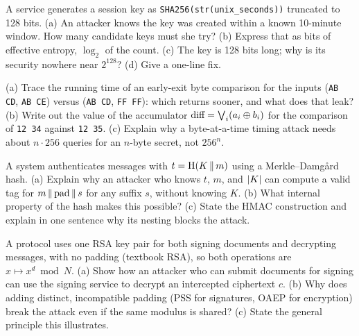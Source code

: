 \begin{exercise}
\label{ch38:ex-entropy}
A service generates a session key as \texttt{SHA256(\allowbreak str(\allowbreak unix\_seconds))} truncated to 128 bits. (a) An attacker knows the key was created within a known 10-minute window. How many candidate keys must she try? (b) Express that as bits of effective entropy, $\log_2$ of the count. (c) The key is 128 bits long; why is its security nowhere near $2^{128}$? (d) Give a one-line fix.
\end{exercise}

\begin{exercise}
\label{ch38:ex-ct}
(a) Trace the running time of an early-exit byte comparison for the inputs (\texttt{AB CD}, \texttt{AB CE}) versus (\texttt{AB CD}, \texttt{FF FF}): which returns sooner, and what does that leak? (b) Write out the value of the accumulator $\text{diff} = \bigvee_i (a_i \oplus b_i)$ for the comparison of \texttt{12 34} against \texttt{12 35}. (c) Explain why a byte-at-a-time timing attack needs about $n \cdot 256$ queries for an $n$-byte secret, not $256^n$.
\end{exercise}

\begin{exercise}
\label{ch38:ex-lenext}
A system authenticates messages with $t = \operatorname{H}(K \,\|\, m)$ using a Merkle--Damg{\aa}rd hash. (a) Explain why an attacker who knows $t$, $m$, and $\lvert K\rvert$ can compute a valid tag for $m \,\|\, \text{pad} \,\|\, s$ for any suffix $s$, without knowing $K$. (b) What internal property of the hash makes this possible? (c) State the HMAC construction and explain in one sentence why its nesting blocks the attack.
\end{exercise}

\begin{exercise}
\label{ch38:ex-keyreuse}
A protocol uses one RSA key pair for both signing documents and decrypting messages, with no padding (textbook RSA), so both operations are $x \mapsto x^d \bmod N$. (a) Show how an attacker who can submit documents for signing can use the signing service to decrypt an intercepted ciphertext $c$. (b) Why does adding distinct, incompatible padding (PSS for signatures, OAEP for encryption) break the attack even if the same modulus is shared? (c) State the general principle this illustrates.
\end{exercise}


